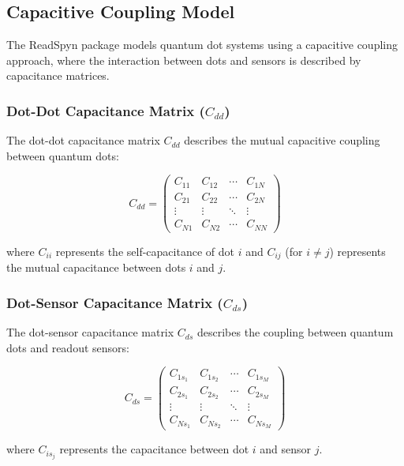 \documentclass{article}
\begin{document}
\subsection{Capacitive Coupling Model}

The ReadSpyn package models quantum dot systems using a capacitive coupling approach, where the interaction between dots and sensors is described by capacitance matrices.

\subsubsection{Dot-Dot Capacitance Matrix ($C_{dd}$)}

The dot-dot capacitance matrix $C_{dd}$ describes the mutual capacitive coupling between quantum dots:

\begin{equation}
C_{dd} = \begin{pmatrix}
C_{11} & C_{12} & \cdots & C_{1N} \\
C_{21} & C_{22} & \cdots & C_{2N} \\
\vdots & \vdots & \ddots & \vdots \\
C_{N1} & C_{N2} & \cdots & C_{NN}
\end{pmatrix}
\end{equation}

where $C_{ii}$ represents the self-capacitance of dot $i$ and $C_{ij}$ (for $i \neq j$) represents the mutual capacitance between dots $i$ and $j$.

\subsubsection{Dot-Sensor Capacitance Matrix ($C_{ds}$)}

The dot-sensor capacitance matrix $C_{ds}$ describes the coupling between quantum dots and readout sensors:

\begin{equation}
C_{ds} = \begin{pmatrix}
C_{1s_1} & C_{1s_2} & \cdots & C_{1s_M} \\
C_{2s_1} & C_{2s_2} & \cdots & C_{2s_M} \\
\vdots & \vdots & \ddots & \vdots \\
C_{Ns_1} & C_{Ns_2} & \cdots & C_{Ns_M}
\end{pmatrix}
\end{equation}

where $C_{is_j}$ represents the capacitance between dot $i$ and sensor $j$.
\end{document}

